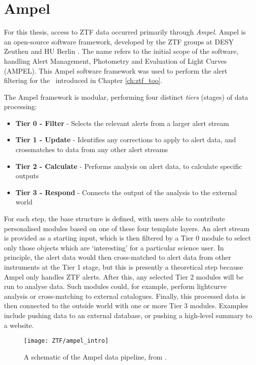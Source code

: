 \section{Ampel}

For this thesis, access to ZTF data occurred primarily through \emph{Ampel}. Ampel is an open-source  software framework, developed by the ZTF groups at DESY Zeuthen and HU Berlin . The name refers to the initial scope of the software, handling Alert Management, Photometry and Evaluation of Light Curves (AMPEL). This Ampel software framework was used to perform the alert filtering for the \ztf ~introduced in Chapter \ref{ch:ztf_too}.

The Ampel framework is modular, performing four distinct \emph{tiers} (stages) of data processing:

\begin{itemize}
	\item \textbf{Tier 0 - Filter} - Selects the relevant alerts from a larger alert stream
	\item \textbf{Tier 1 - Update} - Identifies any corrections to apply to alert data, and crossmatches to data from any other alert streams
	\item \textbf{Tier 2 - Calculate} - Performs analysis on alert data, to calculate specific outputs
	\item \textbf{Tier 3 - Respond} - Connects the output of the analysis to the external world
\end{itemize}

For each step, the base structure is defined, with users able to contribute personalised modules based on one of these four template layers. An alert stream is provided as a starting input, which is then filtered by a Tier 0 module to select only those objects which are `interesting' for a particular science user. In principle, the alert data would then cross-matched to alert data from other instruments at the Tier 1 stage, but this is presently a theoretical step because Ampel only handles ZTF alerts. After this, any selected Tier 2 modules will be run to analyse data. Such modules could, for example, perform lightcurve analysis or cross-matching to external catalogues. Finally, this processed data is then connected to the outside world with one or more Tier 3 modules. Examples include pushing data to an external database, or pushing a high-level summary to a website. 

\begin{figure}[!ht]
	\centering \texttt{[image: ZTF/ampel\_intro]}
	\caption{A schematic of the Ampel data pipeline, from \cite{ampel}.}
	\label{fig:ampel_pipeline}
\end{figure}

